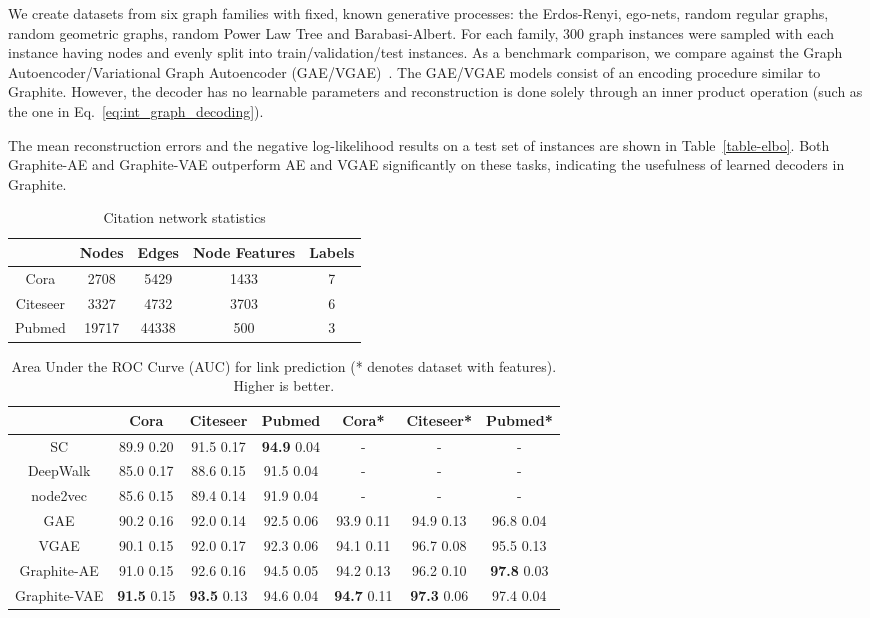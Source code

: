\documentclass{article}
\newcommand{\name}{Graphite}
\begin{document}
We create datasets from six graph families with fixed, known generative processes: the Erdos-Renyi, ego-nets, random regular graphs,  random geometric graphs, random Power Law Tree and Barabasi-Albert. For each family, 300 graph instances were sampled with each instance having  nodes and evenly split into train/validation/test instances. As a benchmark comparison, we compare against the Graph Autoencoder/Variational Graph Autoencoder (GAE/VGAE)~\citep{kipf2016variational}. The GAE/VGAE models consist of an encoding procedure similar to \name{}. However, the decoder has no learnable parameters and reconstruction is done solely through an inner product operation (such as the one in Eq.~\eqref{eq:int_graph_decoding}). 

The mean reconstruction errors and the negative log-likelihood results on a test set of instances are shown in Table~\ref{table-elbo}. Both \name{}-AE and \name{}-VAE outperform AE and VGAE significantly on these tasks, indicating the usefulness of learned decoders in \name{}. 


\begin{table}[t]
\centering
  \caption{Citation network statistics}
  \label{table-stats}
  \vspace{0.05in}
  \centering
  \begin{tabular}{|c|c|c|c|c|}
    \toprule
	& Nodes & Edges & Node Features & Labels \\
    \midrule
    Cora & 2708 & 5429 & 1433 & 7\\
    Citeseer & 3327 & 4732 & 3703 & 6\\
    Pubmed & 19717 & 44338 & 500 & 3\\
    \bottomrule
  \end{tabular}
\end{table}

\begin{table*}[t]
  \caption{Area Under the ROC Curve (AUC) for link prediction (* denotes dataset with features). Higher is better.
  }
  \label{table-auc}
   \vspace{0.05in}
  \centering
  \begin{tabular}{|c|c|c|c|c|c|c|}
    \toprule
	& Cora &  Citeseer & Pubmed & Cora* & Citeseer* & Pubmed* \\
    \midrule
    SC & 89.9  0.20 & 91.5  0.17& \textbf{94.9}  0.04 & - & - & -\\
    DeepWalk & 85.0  0.17& 88.6  0.15& 91.5  0.04& - & - & -\\
    node2vec & 85.6  0.15& 89.4  0.14& 91.9  0.04 & - & - & -\\
    GAE & 90.2  0.16& 92.0  0.14& 92.5  0.06& 93.9  0.11& 94.9  0.13& 96.8  0.04\\
    VGAE & 90.1  0.15& 92.0  0.17& 92.3  0.06 & 94.1  0.11& 96.7  0.08& 95.5  0.13\\
    \midrule
    \name{}-AE & 91.0  0.15 & 92.6  0.16& 94.5  0.05& 94.2  0.13& 96.2  0.10& \textbf{97.8}  0.03 \\
    \name-VAE & \textbf{91.5}  0.15 & \textbf{93.5}  0.13 & 94.6  0.04& \textbf{94.7}  0.11 & \textbf{97.3}  0.06 & 97.4  0.04\\
    \bottomrule
  \end{tabular}
\end{table*}
\end{document}
